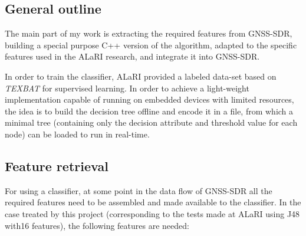 \documentclass[a4paper]{usiinfbachelorproject}
\begin{document}
	\subsection{\textbf{General outline}}

The main part of my work is extracting the required features from GNSS-SDR, building a special purpose C++ version of the algorithm, adapted to the specific features used in the ALaRI research, and integrate it into GNSS-SDR.

In order to train the classifier, ALaRI provided a labeled data-set based on \emph{TEXBAT} for supervised learning. In order to achieve 
a light-weight implementation capable of running on embedded devices with limited resources, the idea is to build the
decision tree offline and encode it in a file, from which a minimal tree (containing only the decision attribute and threshold value for each node) can be loaded to run in real-time.
		
	\subsection{\textbf{Feature retrieval}}
	
For using a classifier, at some point in the data flow of GNSS-SDR all the required features need to be assembled
and made available to the classifier. In the case treated by this project (corresponding to the tests made at ALaRI
using J48 with16 features), the following features are needed:
\end{document}
